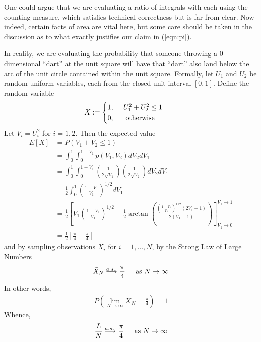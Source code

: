 One could argue that we are evaluating a ratio of integrals with each using the counting measure, which satisfies technical correctness but is far from clear.  Now indeed, certain facts of area are vital here, but some care should be taken in the discussion as to what exactly justifies our claim in (\ref{eqn:pi}).

In reality, we are evaluating the probability that someone throwing a 0-dimensional ``dart'' at the unit square will have that ``dart'' also land below the arc of the unit circle contained within the unit square.  Formally, let $U_1$ and $U_2$ be random uniform variables, each from the closed unit interval $[0, 1]$.  Define the random variable
\begin{align*}
X &:= 
\begin{cases} 
1\text{, } \hspace{.4cm} U_1^2 + U_2^2 \leq 1\\ 
0\text{, \hspace{.4cm} otherwise}
\end{cases}
\end{align*}
Let $V_i = U_i^2$ for $i=1, 2$. Then the expected value
\begin{align*}
E[X] &= P( V_1 + V_2 \leq 1 )\\
     &= \int_0^1 \int_0^{1-V_1} p(V_1, V_2)dV_2 dV_1\\
     &= \int_0^1 \int_0^{1-V_1} \left( \frac{1}{2\sqrt{V_1}} \right) \left( \frac{1}{2\sqrt{V_2}} \right)dV_2 dV_1\\
     &= \frac{1}{2}\int_0^1 \left(\frac{1-V_1}{V_1}\right)^{1/2}dV_1\\
     &= \frac{1}{2} \left[ 
	V_1\left(\frac{1-V_1}{V_1}\right)^{1/2} 
	 - \frac{1}{2} \arctan\left(\frac{\left(\frac{1-V_1}{V_1}\right)^{1/2} (2V_1-1)}{2(V_1-1)}\right) 
	\right]_{V_1\rightarrow 0}^{V_1\rightarrow 1}\\
     &= \frac{1}{2}\left[ \frac{\pi}{4} +\frac{\pi}{4}  \right]
\end{align*}
and by sampling observations $X_i$ for $i=1,\dots,N$, by the Strong Law of Large Numbers~
\begin{equation}
\bar{X}_N \longrightarrow^{\hspace{-.55cm} a.s.} \hspace{.1cm} \frac{\pi}{4} \hspace{.4cm} \text{ as } N\rightarrow \infty
\label{eqn:as_convergence}
\end{equation}
In other words,
\begin{align*}
P\left(\lim_{N\rightarrow\infty} \bar{X}_N = \frac{\pi}{4}\right) = 1
\end{align*}
Whence,
\begin{align*}
\frac{L}{N}  \longrightarrow^{\hspace{-.55cm} a.s.} \hspace{.1cm} \frac{\pi}{4} \hspace{.4cm} \text{ as } N\rightarrow \infty
\end{align*}

